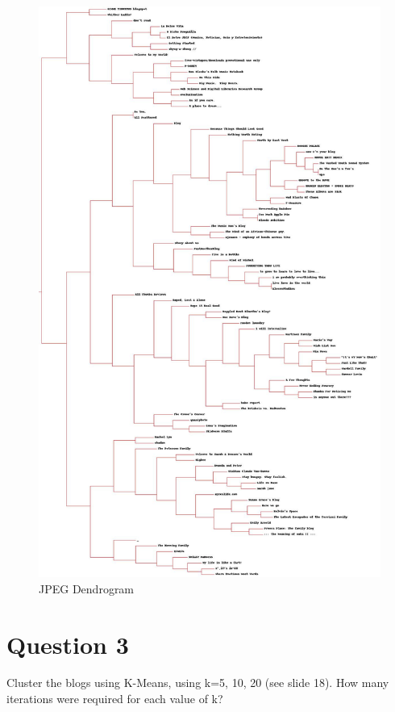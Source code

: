 \documentclass{article}
\begin{document}
\begin{figure}[H]
\centering
\includegraphics[scale=0.30]{q02/blogclust}
\caption{JPEG Dendrogram}
\label{blogclust}
\end{figure}



\newpage
\section*{Question 3}
Cluster the blogs using K-Means, using k=5, 10, 20 (see slide 18). How many iterations were required for each value of k?
\end{document}
